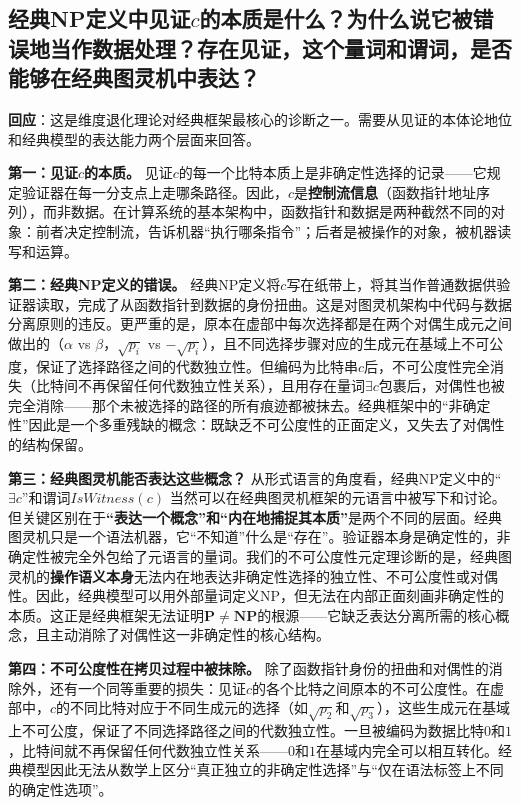 \documentclass{ctexart}
\begin{document}
	
	\subsection{经典NP定义中见证$c$的本质是什么？为什么说它被错误地当作数据处理？存在见证，这个量词和谓词，是否能够在经典图灵机中表达？}
	
	\textbf{回应}：这是维度退化理论对经典框架最核心的诊断之一。需要从见证的本体论地位和经典模型的表达能力两个层面来回答。
	
	\textbf{第一：见证$c$的本质。} 见证$c$的每一个比特本质上是非确定性选择的记录——它规定验证器在每一分支点上走哪条路径。因此，$c$是\textbf{控制流信息}（函数指针地址序列），而非数据。在计算系统的基本架构中，函数指针和数据是两种截然不同的对象：前者决定控制流，告诉机器``执行哪条指令''；后者是被操作的对象，被机器读写和运算。
	
	\textbf{第二：经典NP定义的错误。} 经典NP定义将$c$写在纸带上，将其当作普通数据供验证器读取，完成了从函数指针到数据的身份扭曲。这是对图灵机架构中代码与数据分离原则的违反。更严重的是，原本在虚部中每次选择都是在两个对偶生成元之间做出的（$\alpha$ vs $\beta$，$\sqrt{p_i}$ vs $-\sqrt{p_i}$），且不同选择步骤对应的生成元在基域上不可公度，保证了选择路径之间的代数独立性。但编码为比特串$c$后，不可公度性完全消失（比特间不再保留任何代数独立性关系），且用存在量词$\exists c$包裹后，对偶性也被完全消除——那个未被选择的路径的所有痕迹都被抹去。经典框架中的``非确定性''因此是一个多重残缺的概念：既缺乏不可公度性的正面定义，又失去了对偶性的结构保留。
	
	\textbf{第三：经典图灵机能否表达这些概念？} 从形式语言的角度看，经典NP定义中的``$\exists c$''和谓词$IsWitness(c)$ 当然可以在经典图灵机框架的元语言中被写下和讨论。但关键区别在于\textbf{``表达一个概念''和``内在地捕捉其本质''}是两个不同的层面。经典图灵机只是一个语法机器，它``不知道''什么是``存在''。验证器本身是确定性的，非确定性被完全外包给了元语言的量词。我们的不可公度性元定理\cite{philo2026,models2026}诊断的是，经典图灵机的\textbf{操作语义本身}无法内在地表达非确定性选择的独立性、不可公度性或对偶性。因此，经典模型可以用外部量词定义NP，但无法在内部正面刻画非确定性的本质。这正是经典框架无法证明$\mathbf{P}\neq\mathbf{NP}$的根源——它缺乏表达分离所需的核心概念，且主动消除了对偶性这一非确定性的核心结构。
	
	\textbf{第四：不可公度性在拷贝过程中被抹除。} 除了函数指针身份的扭曲和对偶性的消除外，还有一个同等重要的损失：见证$c$的各个比特之间原本的不可公度性。在虚部中，$c$的不同比特对应于不同生成元的选择（如$\sqrt{p_2}$和$\sqrt{p_3}$），这些生成元在基域上不可公度，保证了不同选择路径之间的代数独立性。一旦被编码为数据比特$0$和$1$，比特间就不再保留任何代数独立性关系——$0$和$1$在基域内完全可以相互转化。经典模型因此无法从数学上区分``真正独立的非确定性选择''与``仅在语法标签上不同的确定性选项''。
	
\end{document}
